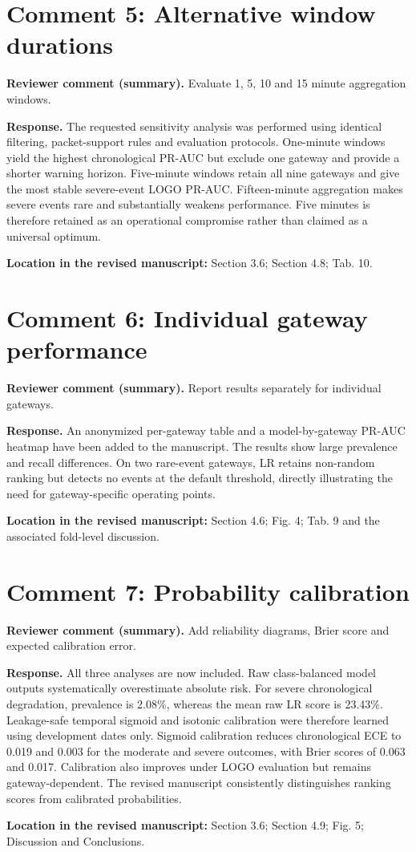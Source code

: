 \documentclass[11pt]{article}
\newcommand{\ReviewerComment}[1]{\par\noindent\textcolor{reviewblue}{\textbf{Reviewer comment (summary).}} #1\par}
\newcommand{\AuthorResponse}[1]{\par\noindent\textcolor{responsegreen}{\textbf{Response.}} #1\par}
\newcommand{\Location}[1]{\par\noindent\textbf{Location in the revised manuscript:} #1\par}
\begin{document}
\section*{Comment 5: Alternative window durations}
\ReviewerComment{Evaluate 1, 5, 10 and 15 minute aggregation windows.}
\AuthorResponse{The requested sensitivity analysis was performed using identical filtering, packet-support rules and evaluation protocols. One-minute windows yield the highest chronological PR-AUC but exclude one gateway and provide a shorter warning horizon. Five-minute windows retain all nine gateways and give the most stable severe-event LOGO PR-AUC. Fifteen-minute aggregation makes severe events rare and substantially weakens performance. Five minutes is therefore retained as an operational compromise rather than claimed as a universal optimum.}
\Location{Section 3.6; Section 4.8; Tab. 10.}

\section*{Comment 6: Individual gateway performance}
\ReviewerComment{Report results separately for individual gateways.}
\AuthorResponse{An anonymized per-gateway table and a model-by-gateway PR-AUC heatmap have been added to the manuscript. The results show large prevalence and recall differences. On two rare-event gateways, LR retains non-random ranking but detects no events at the default threshold, directly illustrating the need for gateway-specific operating points.}
\Location{Section 4.6; Fig. 4; Tab. 9 and the associated fold-level discussion.}

\section*{Comment 7: Probability calibration}
\ReviewerComment{Add reliability diagrams, Brier score and expected calibration error.}
\AuthorResponse{All three analyses are now included. Raw class-balanced model outputs systematically overestimate absolute risk. For severe chronological degradation, prevalence is 2.08\%, whereas the mean raw LR score is 23.43\%. Leakage-safe temporal sigmoid and isotonic calibration were therefore learned using development dates only. Sigmoid calibration reduces chronological ECE to 0.019 and 0.003 for the moderate and severe outcomes, with Brier scores of 0.063 and 0.017. Calibration also improves under LOGO evaluation but remains gateway-dependent. The revised manuscript consistently distinguishes ranking scores from calibrated probabilities.}
\Location{Section 3.6; Section 4.9; Fig. 5; Discussion and Conclusions.}
\end{document}
